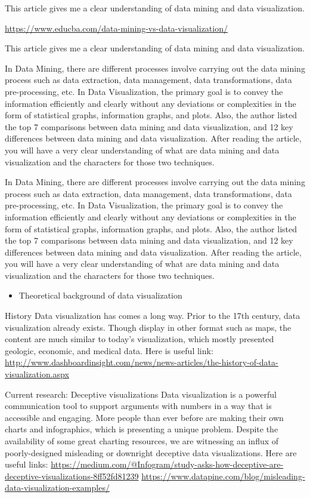 \documentclass[]{book}
\providecommand{\tightlist}{%
  \setlength{\itemsep}{0pt}\setlength{\parskip}{0pt}}
\theoremstyle{definition}
\theoremstyle{definition}
\theoremstyle{definition}
\theoremstyle{remark}
\begin{document}
This article gives me a clear understanding of data mining and data
visualization.

\url{https://www.educba.com/data-mining-vs-data-visualization/}

This article gives me a clear understanding of data mining and data
visualization.

In Data Mining, there are different processes involve carrying out the
data mining process such as data extraction, data management, data
transformations, data pre-processing, etc. In Data Visualization, the
primary goal is to convey the information efficiently and clearly
without any deviations or complexities in the form of statistical
graphs, information graphs, and plots. Also, the author listed the top 7
comparisons between data mining and data visualization, and 12 key
differences between data mining and data visualization. After reading
the article, you will have a very clear understanding of what are data
mining and data visualization and the characters for those two
techniques.

In Data Mining, there are different processes involve carrying out the
data mining process such as data extraction, data management, data
transformations, data pre-processing, etc. In Data Visualization, the
primary goal is to convey the information efficiently and clearly
without any deviations or complexities in the form of statistical
graphs, information graphs, and plots. Also, the author listed the top 7
comparisons between data mining and data visualization, and 12 key
differences between data mining and data visualization. After reading
the article, you will have a very clear understanding of what are data
mining and data visualization and the characters for those two
techniques.

\begin{itemize}
\tightlist
\item
  Theoretical background of data visualization
\end{itemize}

History Data visualization has comes a long way. Prior to the 17th
century, data visualization already exists. Though display in other
format such as maps, the content are much similar to today's
visualization, which mostly presented geologic, economic, and medical
data. Here is useful link:
\url{http://www.dashboardinsight.com/news/news-articles/the-history-of-data-visualization.aspx}

Current research: Deceptive visualizations Data visualization is a
powerful communication tool to support arguments with numbers in a way
that is accessible and engaging. More people than ever before are making
their own charts and infographics, which is presenting a unique problem.
Despite the availability of some great charting resources, we are
witnessing an influx of poorly-designed misleading or downright
deceptive data visualizations. Here are useful links:
\url{https://medium.com/@Infogram/study-asks-how-deceptive-are-deceptive-visualizations-8ff52fd81239}
\url{https://www.datapine.com/blog/misleading-data-visualization-examples/}
\end{document}
